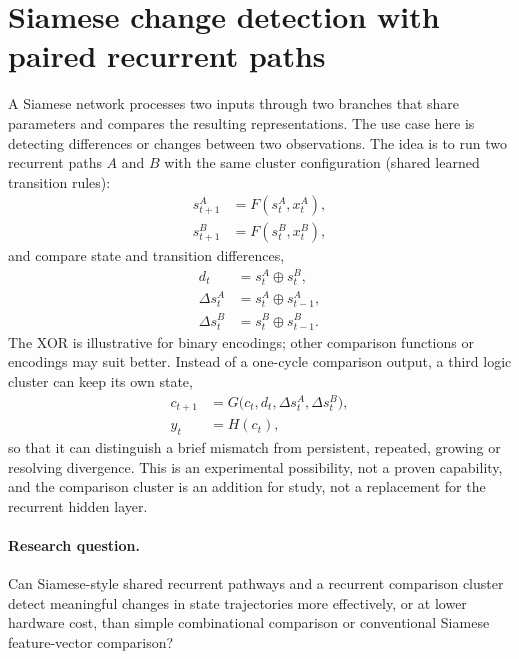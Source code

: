 \section{Siamese change detection with paired recurrent paths}
\label{sec:siamese}
A Siamese network processes two inputs through two branches that share parameters and compares the resulting representations. The use case here is detecting differences or changes between two observations. The idea is to run two recurrent paths $A$ and $B$ with the same cluster configuration (shared learned transition rules):
\begin{align}
s^A_{t+1} &= F(s^A_t, x^A_t), \\
s^B_{t+1} &= F(s^B_t, x^B_t),
\end{align}
and compare state and transition differences,
\begin{align}
d_t &= s^A_t \oplus s^B_t, \\
\Delta s^A_t &= s^A_t \oplus s^A_{t-1}, \\
\Delta s^B_t &= s^B_t \oplus s^B_{t-1}.
\end{align}
The XOR is illustrative for binary encodings; other comparison functions or encodings may suit better. Instead of a one-cycle comparison output, a third logic cluster can keep its own state,
\begin{align}
c_{t+1} &= G\bigl(c_t, d_t, \Delta s^A_t, \Delta s^B_t\bigr),\\
y_t &= H(c_t),
\end{align}
so that it can distinguish a brief mismatch from persistent, repeated, growing or resolving divergence. This is an experimental possibility, not a proven capability, and the comparison cluster is an addition for study, not a replacement for the recurrent hidden layer.

\paragraph{Research question.} Can Siamese-style shared recurrent pathways and a recurrent comparison cluster detect meaningful changes in state trajectories more effectively, or at lower hardware cost, than simple combinational comparison or conventional Siamese feature-vector comparison?

